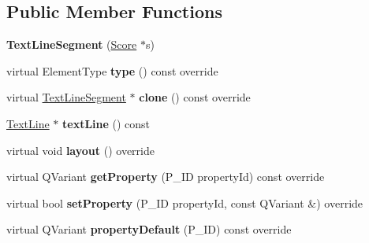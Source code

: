 \subsection*{Public Member Functions}
\begin{DoxyCompactItemize}
\item 
\mbox{\label{class_ms_1_1_text_line_segment_a39a6f2d2769eebc3c29ce9004c011194}} 
{\bfseries Text\+Line\+Segment} (\hyperlink{class_ms_1_1_score}{Score} $\ast$s)
\item 
\mbox{\label{class_ms_1_1_text_line_segment_a1bf04baf3f1ddbd9a4318960135379da}} 
virtual Element\+Type {\bfseries type} () const override
\item 
\mbox{\label{class_ms_1_1_text_line_segment_a6de4d84a8c367d2a4f2315473db1c1bb}} 
virtual \hyperlink{class_ms_1_1_text_line_segment}{Text\+Line\+Segment} $\ast$ {\bfseries clone} () const override
\item 
\mbox{\label{class_ms_1_1_text_line_segment_ae58c9081bacc77bccd29f5ae2f8cb82a}} 
\hyperlink{class_ms_1_1_text_line}{Text\+Line} $\ast$ {\bfseries text\+Line} () const
\item 
\mbox{\label{class_ms_1_1_text_line_segment_a751e35e8d42d8e0519481a426488ce6b}} 
virtual void {\bfseries layout} () override
\item 
\mbox{\label{class_ms_1_1_text_line_segment_a3ec3474c8b5e64f09441ebed3205cd38}} 
virtual Q\+Variant {\bfseries get\+Property} (P\+\_\+\+ID property\+Id) const override
\item 
\mbox{\label{class_ms_1_1_text_line_segment_afe32643341590d67a802600a76215bd1}} 
virtual bool {\bfseries set\+Property} (P\+\_\+\+ID property\+Id, const Q\+Variant \&) override
\item 
\mbox{\label{class_ms_1_1_text_line_segment_a425facf7ed8d2333d1cb785935588a15}} 
virtual Q\+Variant {\bfseries property\+Default} (P\+\_\+\+ID) const override
\item 

\end{DoxyCompactItemize}
